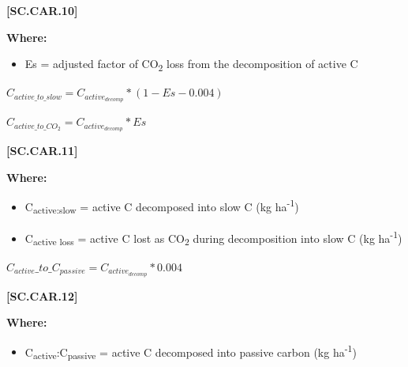             {\raggedleft \textbf{[SC.CAR.10]}\par}
            \vspace{0.5cm}

        \textbf{Where:}
            
        \begin{itemize}
            \item Es = adjusted factor of CO\textsubscript{2} loss from the decomposition of active C \parencite{parton1987analysis}
        \end{itemize}
        \vspace{0.5cm}

    \begin{center}
\(C_{active\_to\_slow}=C_{active_{decomp}} * (1-Es-0.004)\)
\vspace{0.1cm}

\(C_{active\_to\_CO_2}=C_{active_{decomp}} *Es\)

    \end{center}
        \vspace{0.5cm} 
    
            {\raggedleft \textbf{[SC.CAR.11]}\par}
            \vspace{0.5cm}

        \textbf{Where:}
            
        \begin{itemize}
            \item C\textsubscript{active:slow} = active C decomposed into slow C (kg ha\textsuperscript{-1})
            \item C\textsubscript{active loss} = active C lost as CO\textsubscript{2} during decomposition into slow C (kg ha\textsuperscript{-1})
        \end{itemize}
        \vspace{0.5cm}

    \begin{center}
\(C_{active}\_to\_C_{passive}=C_{active_{decomp}} * 0.004	\)

    \end{center}
        \vspace{0.5cm} 
    
            {\raggedleft \textbf{[SC.CAR.12]}\par}
            \vspace{0.5cm}

        \textbf{Where:}
            
        \begin{itemize}
            \item C\textsubscript{active}:C\textsubscript{passive} = active C decomposed into passive carbon (kg ha\textsuperscript{-1})
        \end{itemize}
        \vspace{0.5cm}

